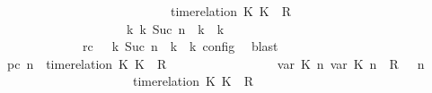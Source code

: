 \begin{isabellebody}
\ \ \ \ \ \ \ \ \ \ \ \ \ \ \ \ \ \ \ \ \ \ \ \ {\isasymturnstile}\ {\isasymPsi}\ {\isasymtriangleright}\ {\isacharparenleft}{\isacharparenleft}time{\isacharminus}relation\ {\isasymlfloor}K\ K\ {\isasymin}\ R{\isacharparenright}\ {\isacharhash}\ {\isasymPhi}{\isacharparenright}{\isacharparenright}\isanewline
\ \ \ \ \ \ \ \ \ \ \ \ \ \ \ \ \ \ \ \ {\isasymhookrightarrow}\isactrlbsup k\isactrlesup \ {\isacharparenleft}{\isasymGamma}\isactrlsub k{\isacharcomma}\ Suc\ n\ {\isasymturnstile}\ {\isasymPsi}\isactrlsub k\ {\isasymtriangleright}\ {\isasymPhi}\isactrlsub k{\isacharparenright}{\isacharparenright}{\isacartoucheclose}\isanewline
\ \ \ \ \ \ \ \ \ \ \ \ \ rc{\isacharcolon}{\isacartoucheopen}{\isasymrho}\ {\isasymin}\ {\isasymlbrakk}\ {\isasymGamma}\isactrlsub k{\isacharcomma}\ Suc\ n\ {\isasymturnstile}\ {\isasymPsi}\isactrlsub k\ {\isasymtriangleright}\ {\isasymPhi}\isactrlsub k\ {\isasymrbrakk}\isactrlsub c\isactrlsub o\isactrlsub n\isactrlsub f\isactrlsub i\isactrlsub g{\isacartoucheclose}\ \isamarkupfalse%
\ blast\isanewline
\ \ \ \ \ \ \ \ \isamarkupfalse%
\ pc{\isacharcolon}{\isacartoucheopen}{\isacharparenleft}{\isasymGamma}{\isacharcomma}\ n\ {\isasymturnstile}\ {\isacharparenleft}{\isacharparenleft}time{\isacharminus}relation\ {\isasymlfloor}K\ K\ {\isasymin}\ R{\isacharparenright}\ {\isacharhash}\ {\isasymPsi}{\isacharparenright}\ {\isasymtriangleright}\ {\isasymPhi}{\isacharparenright}\isanewline
\ \ \ \ \ \ \ \ \ \ \ \ {\isasymhookrightarrow}\ {\isacharparenleft}{\isacharparenleft}{\isacharparenleft}{\isasymlfloor}{\isasymtau}\isactrlsub v\isactrlsub a\isactrlsub r\ {\isacharparenleft}K\ n{\isacharparenright}{\isacharcomma}\ {\isasymtau}\isactrlsub v\isactrlsub a\isactrlsub r\ {\isacharparenleft}K\ n{\isacharparenright}{\isasymrfloor}\ {\isasymin}\ R{\isacharparenright}\ {\isacharhash}\ {\isasymGamma}{\isacharparenright}{\isacharcomma}\ n\isanewline
\ \ \ \ \ \ \ \ \ \ \ \ \ \ \ \ \ \ {\isasymturnstile}\ {\isasymPsi}\ {\isasymtriangleright}\ {\isacharparenleft}{\isacharparenleft}time{\isacharminus}relation\ {\isasymlfloor}K\ K\ {\isasymin}\ R{\isacharparenright}\ {\isacharhash}\ {\isasymPhi}{\isacharparenright}{\isacharparenright}{\isacartoucheclose}\isanewline
\ \ \ \ \ \ \ \ \ \ \isamarkupfalse%

\end{isabellebody}
